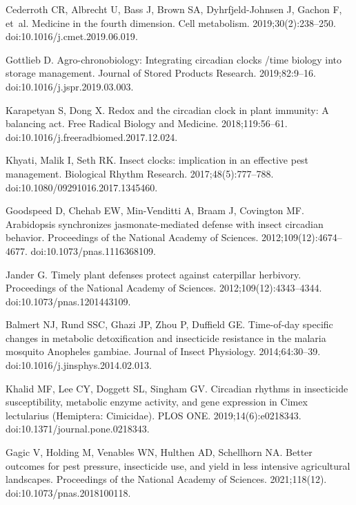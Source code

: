 \documentclass[12pt]{article}
\begin{document}
\begin{thebibliography}{10}
	Cederroth CR, Albrecht U, Bass J, Brown SA, Dyhrfjeld-Johnsen J, Gachon F,
	et~al.
	\newblock Medicine in the fourth dimension.
	\newblock Cell metabolism. 2019;30(2):238--250.
	\newblock doi:{10.1016/j.cmet.2019.06.019}.
	
	Gottlieb D.
	\newblock Agro-chronobiology: {Integrating} circadian clocks /time biology into
	storage management.
	\newblock Journal of Stored Products Research. 2019;82:9--16.
	\newblock doi:{10.1016/j.jspr.2019.03.003}.
	
	Karapetyan S, Dong X.
	\newblock Redox and the circadian clock in plant immunity: {A} balancing act.
	\newblock Free Radical Biology and Medicine. 2018;119:56--61.
	\newblock doi:{10.1016/j.freeradbiomed.2017.12.024}.
	
	{Khyati}, Malik I, Seth RK.
	\newblock Insect clocks: implication in an effective pest management.
	\newblock Biological Rhythm Research. 2017;48(5):777--788.
	\newblock doi:{10.1080/09291016.2017.1345460}.
	
	Goodspeed D, Chehab EW, Min-Venditti A, Braam J, Covington MF.
	\newblock Arabidopsis synchronizes jasmonate-mediated defense with insect
	circadian behavior.
	\newblock Proceedings of the National Academy of Sciences.
	2012;109(12):4674--4677.
	\newblock doi:{10.1073/pnas.1116368109}.
	
	Jander G.
	\newblock Timely plant defenses protect against caterpillar herbivory.
	\newblock Proceedings of the National Academy of Sciences.
	2012;109(12):4343--4344.
	\newblock doi:{10.1073/pnas.1201443109}.
	
	Balmert NJ, Rund SSC, Ghazi JP, Zhou P, Duffield GE.
	\newblock Time-of-day specific changes in metabolic detoxification and
	insecticide resistance in the malaria mosquito {Anopheles} gambiae.
	\newblock Journal of Insect Physiology. 2014;64:30--39.
	\newblock doi:{10.1016/j.jinsphys.2014.02.013}.
	
	Khalid MF, Lee CY, Doggett SL, Singham GV.
	\newblock Circadian rhythms in insecticide susceptibility, metabolic enzyme
	activity, and gene expression in {Cimex} lectularius ({Hemiptera}:
	{Cimicidae}).
	\newblock PLOS ONE. 2019;14(6):e0218343.
	\newblock doi:{10.1371/journal.pone.0218343}.
	
	Gagic V, Holding M, Venables WN, Hulthen AD, Schellhorn NA.
	\newblock Better outcomes for pest pressure, insecticide use, and yield in less
	intensive agricultural landscapes.
	\newblock Proceedings of the National Academy of Sciences. 2021;118(12).
	\newblock doi:{10.1073/pnas.2018100118}.
	

\end{thebibliography}
\end{document}
